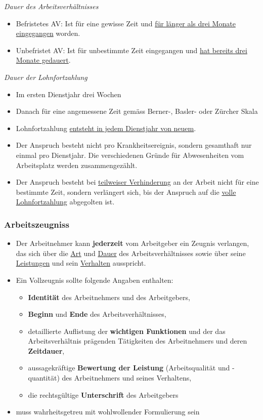 \textit{Dauer des Arbeitsverhältnisses}
\begin{itemize}
    \item Befristetes AV: Ist für eine gewisse Zeit und \underline{für länger als drei Monate eingegangen} worden.
    \item Unbefristet AV: Ist für unbestimmte Zeit eingegangen und \underline{hat bereits drei Monate gedauert}.
\end{itemize}

\textit{Dauer der Lohnfortzahlung}
\begin{itemize}
    \item Im ersten Dienstjahr drei Wochen
    \item Danach für eine angemessene Zeit gemäss Berner-, Basler- oder Zürcher Skala
    \item Lohnfortzahlung \underline{entsteht in jedem Dienstjahr von neuem}.
    \item Der Anspruch besteht nicht pro Krankheitsereignis, sondern gesamthaft nur einmal pro Dienstjahr. Die verschiedenen Gründe für Abwesenheiten vom Arbeitsplatz werden zusammengezählt.
    \item Der Anspruch besteht bei \underline{teilweiser Verhinderung} an der Arbeit nicht für eine bestimmte Zeit, sondern verlängert sich, bis der Anspruch auf die \underline{volle Lohnfortzahlung} abgegolten ist.
\end{itemize}

\subsubsection{Arbeitszeugniss}
\begin{itemize}
    \item Der Arbeitnehmer kann \textbf{jederzeit} vom Arbeitgeber ein Zeugnis verlangen, das sich über die \underline{Art} und \underline{Dauer} des Arbeitsverhältnisses sowie über seine \underline{Leistungen} und sein \underline{Verhalten} ausspricht.
    \item Ein Vollzeugnis sollte folgende Angaben enthalten:
    \begin{itemize}
        \item \textbf{Identität} des Arbeitnehmers und des Arbeitgebers,
        \item \textbf{Beginn} und \textbf{Ende} des Arbeitsverhältnisses,
        \item detaillierte Auflistung der \textbf{wichtigen Funktionen} und der das Arbeitsverhältnis prägenden Tätigkeiten des Arbeitnehmers und deren \textbf{Zeitdauer},
        \item aussagekräftige \textbf{Bewertung der Leistung} (Arbeitsqualität und -quantität) des Arbeitnehmers und seines Verhaltens,
        \item die rechtsgültige \textbf{Unterschrift} des Arbeitgebers
    \end{itemize}
    \item muss wahrheitsgetreu mit wohlwollender Formulierung sein
\end{itemize}

